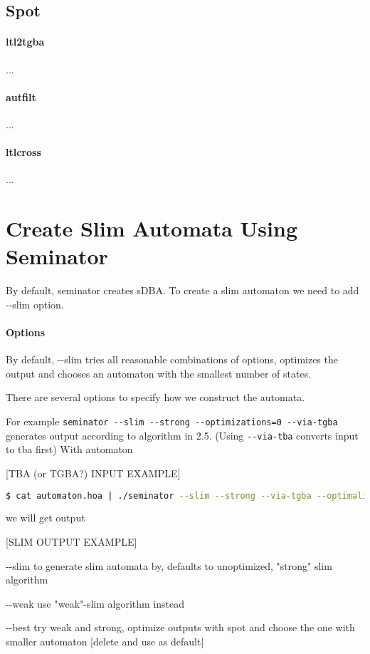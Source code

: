 \documentclass[
	digital
nolof, nolot
]{fithesis3}
\begin{document}
	\subsection{Spot}
			\paragraph{ltl2tgba}...
	\paragraph{autfilt}...
	\paragraph{ltlcross}...
		\section{Create Slim Automata Using Seminator}
		By default, seminator creates sDBA. To create a slim automaton we need to add -{}-slim option. 
		\paragraph{Options} By default, -{}-slim tries all reasonable combinations of options, optimizes the output and chooses an automaton with the smallest number of states.
		
		There are several options to specify how we construct the automata.
		
		For example \texttt{seminator -{}-slim -{}-strong -{}-optimizations=0 -{}-via-tgba} generates output according to algorithm in 2.5. (Using \texttt{-{}-via-tba} converts input to tba first) With automaton
		
		[TBA (or TGBA?) INPUT EXAMPLE]
		
		\begin{lstlisting}[language=bash]
$ cat automaton.hoa | ./seminator --slim --strong --via-tgba --optimalizations=0
		\end{lstlisting}
		
		we will get output
		
		[SLIM OUTPUT EXAMPLE]
		 
		
		-{}-slim to generate slim automata by, defaults to unoptimized, "strong" slim algorithm
		
		-{}-weak use "weak"-slim algorithm instead
		
		-{}-best try weak and strong, optimize outputs with spot and choose the one with smaller automaton [delete and use as default]
		
\end{document}
